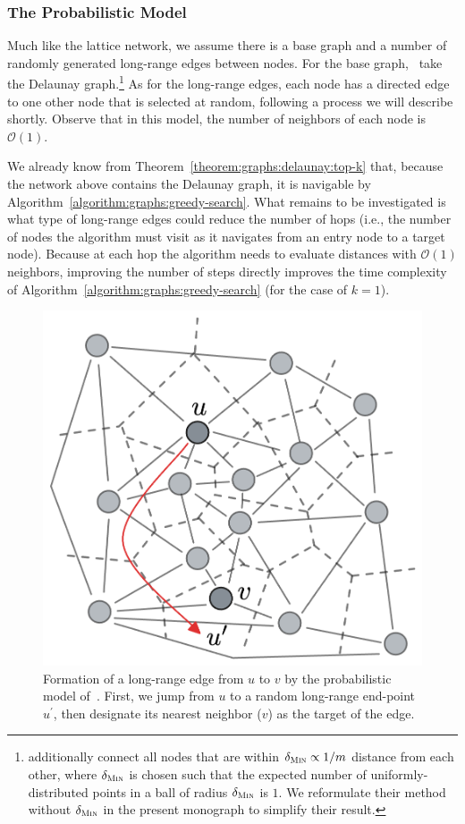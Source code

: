 \subsubsection{The Probabilistic Model}
Much like the lattice network, we assume there is a base graph
and a number of randomly generated long-range edges between nodes.
For the base graph,~\cite{voronet2007}
take the Delaunay graph.\footnote{\cite{voronet2007} additionally
connect all nodes that are within
$\delta_\textsc{Min} \propto 1/m$ distance from each
other, where $\delta_\textsc{Min}$ is chosen
such that the expected number of uniformly-distributed points in a
ball of radius $\delta_\textsc{Min}$ is $1$. We reformulate their method
without $\delta_\textsc{Min}$ in the present monograph to simplify
their result.}
As for the long-range edges, each node has a directed edge to one other node
that is selected at random, following a process we will describe shortly.
Observe that in this model, the number of neighbors of each node is $\mathcal{O}(1)$.

We already know from Theorem~\ref{theorem:graphs:delaunay:top-k} that,
because the network above contains the Delaunay graph, it is navigable by Algorithm~\ref{algorithm:graphs:greedy-search}. What remains to be investigated
is what type of long-range edges could reduce the number of hops (i.e.,
the number of nodes the algorithm must visit as it navigates
from an entry node to a target node).
Because at each hop the algorithm needs to evaluate distances with $\mathcal{O}(1)$
neighbors, improving the number of steps directly improves the time complexity
of Algorithm~\ref{algorithm:graphs:greedy-search} (for the case of $k=1$).

\begin{figure}[t]
    \centering
    \includegraphics[width=0.35\linewidth]{figures/graphs-voronet.png}
    \caption{Formation of a long-range edge from $u$ to $v$ by the probabilistic
    model of~\cite{voronet2007}. First, we jump from $u$ to a random long-range end-point $u^\prime$,
    then designate its nearest neighbor ($v$) as the target of the edge.}
    \label{figure:graphs:voronet}
\end{figure}

